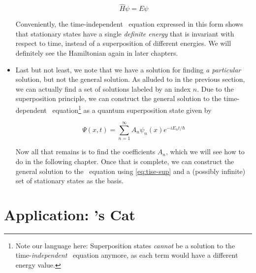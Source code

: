 \begin{itemize}
	\begin{equation}
		\hat{H}\psi = E\psi \label{eq:tise-ham}
	\end{equation}
	
	Conveniently, the time-independent \Sch\ equation expressed in this form shows that stationary states have a single \emph{definite energy} that is invariant with respect to time, instead of a superposition of different energies. 
	We will definitely see the Hamiltonian again in later chapters.
	
	\item Last but not least, we note that we have a solution for finding \emph{a particular} solution, but not the general solution. 
	As alluded to in the previous section, we can actually find a set of solutions labeled by an index $n$. 
	Due to the superposition principle, we can construct the general solution to the time-dependent \Sch\ equation\footnote{Note our language here: Superposition states \emph{cannot} be a solution to the time-\emph{independent} \Sch\ equation anymore, as each term would have a different energy value.} as a quantum superposition state given by
	
	\begin{tcolorbox}[title = Superposition of states] \vspace{-2ex}
		\begin{equation}
		\Psi(x,t) = \sum_{n=1}^{\infty} A_n\psi_n(x)e^{-iE_nt/\hbar} \label{eq:tise-sup}
		\end{equation}
	\end{tcolorbox}

	Now all that remains is to find the coefficients $A_n$, which we will see how to do in the following chapter. 
	Once that is complete, we can construct the general solution to the \Sch\ equation using \autoref{eq:tise-sup} and a (possibly infinite) set of stationary states as the basis.
\end{itemize}


\section[\Sch's Cat]{Application: \Sch's Cat}

